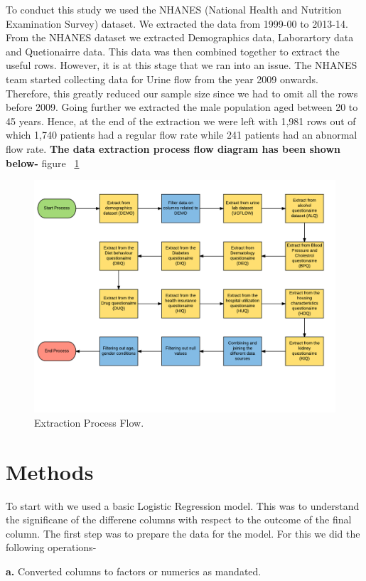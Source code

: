 \documentclass[twoside,11pt]{article}
\begin{document}
To conduct this study we used the NHANES (National Health and Nutrition Examination Survey) dataset. We extracted the data from 1999-00 to 2013-14. From the NHANES dataset we extracted Demographics data, Laborartory data and Quetionairre data. This data was then combined together to extract the useful rows. However, it is at this stage that we ran into an issue. The NHANES team started collecting data for Urine flow from the year 2009 onwards. Therefore, this greatly reduced our sample size since we had to omit all the rows before 2009. Going further we extracted the male population aged between 20 to 45 years. Hence, at the end of the extraction we were left with 1,981 rows out of which 1,740 patients had a regular flow rate while 241 patients had an abnormal flow rate.
\vspace{5mm} \textbf{The data extraction process flow diagram has been shown below-} figure ~\ref{fig:Extraction_Process_Flow}
\begin{figure}[htbp]
  \centering 
  \includegraphics[width=4.5in]{data_extraction_process.png} 
  \caption{Extraction Process Flow.}
  \label{fig:Extraction_Process_Flow} 
\end{figure} 

\section{Methods} \label{methods}
To start with we used a basic Logistic Regression model. This was to understand the significane of the differene columns with respect to the outcome of the final column. The first step was to prepare the data for the model. For this we did the following operations-

\textbf{a.} Converted columns to factors or numerics as mandated.
\end{document}
